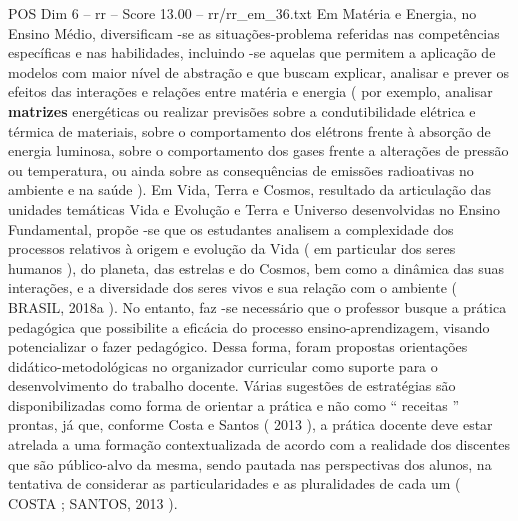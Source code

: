 \begin{textsample}{POS Dim 6 – rr – Score 13.00 – rr/rr\_em\_36.txt}
Em Matéria e Energia, no Ensino Médio, diversificam -se as situações-problema referidas nas competências específicas e nas habilidades, incluindo -se aquelas que permitem a aplicação de modelos com maior nível de abstração e que buscam explicar, analisar e prever os efeitos das interações e relações entre matéria e energia ( por exemplo, analisar \textbf{matrizes} energéticas ou realizar previsões sobre a condutibilidade elétrica e térmica de materiais, sobre o comportamento dos elétrons frente à absorção de energia luminosa, sobre o comportamento dos gases frente a alterações de pressão ou temperatura, ou ainda sobre as consequências de emissões radioativas no ambiente e na saúde ).
Em Vida, Terra e Cosmos, resultado da articulação das unidades temáticas Vida e Evolução e Terra e Universo desenvolvidas no Ensino Fundamental, propõe -se que os estudantes analisem a complexidade dos processos relativos à origem e evolução da Vida ( em particular dos seres humanos ), do planeta, das estrelas e do Cosmos, bem como a dinâmica das suas interações, e a diversidade dos seres vivos e sua relação com o ambiente ( BRASIL, 2018a ).
No entanto, faz -se necessário que o professor busque a prática pedagógica que possibilite a eficácia do processo ensino-aprendizagem, visando potencializar o fazer pedagógico.
Dessa forma, foram propostas orientações didático-metodológicas no organizador curricular como suporte para o desenvolvimento do trabalho docente.
Várias sugestões de estratégias são disponibilizadas como forma de orientar a prática e não como “ receitas ” prontas, já que, conforme Costa e Santos ( 2013 ), a prática docente deve estar atrelada a uma formação contextualizada de acordo com a realidade dos discentes que são público-alvo da mesma, sendo pautada nas perspectivas dos alunos, na tentativa de considerar as particularidades e as pluralidades de cada um ( COSTA ; SANTOS, 2013 ).

\end{textsample}
